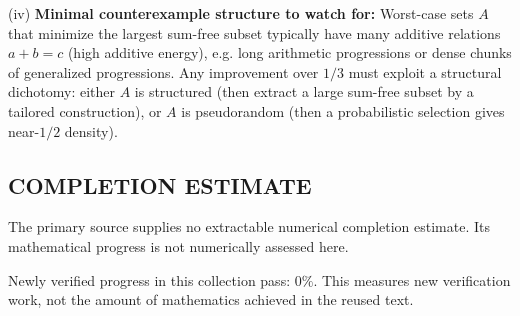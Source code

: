 (iv) \textbf{Minimal counterexample structure to watch for:} Worst-case sets $A$ that minimize the largest sum-free subset typically have many additive relations $a+b=c$ (high additive energy), e.g. long arithmetic progressions or dense chunks of generalized progressions. Any improvement over $1/3$ must exploit a structural dichotomy: either $A$ is structured (then extract a large sum-free subset by a tailored construction), or $A$ is pseudorandom (then a probabilistic selection gives near-$1/2$ density).

\bigskip



\subsection*{COMPLETION ESTIMATE}
The primary source supplies no extractable numerical completion estimate. Its mathematical progress is not numerically assessed here.

Newly verified progress in this collection pass: $0\%$. This measures new verification work, not the amount of mathematics achieved in the reused text.

